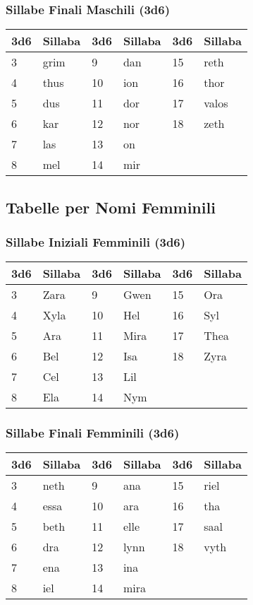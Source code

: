 \begin{multicols}{2}
{\subsubsection*{Sillabe Finali Maschili (3d6)}

\noindent\begin{tabularx}{\linewidth}{X|l|X|l|X|l}
	\toprule
\textbf{3d6} & \textbf{Sillaba} & \textbf{3d6} & \textbf{Sillaba} & \textbf{3d6} & \textbf{Sillaba} \\
\toprule
3 & grim & 9 & dan & 15 & reth \\
4 & thus & 10 & ion & 16 & thor \\
5 & dus & 11 & dor & 17 & valos \\
6 & kar & 12 & nor & 18 & zeth \\
7 & las & 13 & on & & \\
8 & mel & 14 & mir & & \\
\end{tabularx}


\subsection*{Tabelle per Nomi Femminili}

\subsubsection*{Sillabe Iniziali Femminili (3d6)}

\noindent\begin{tabularx}{\linewidth}{X|l|X|l|X|l}
	\toprule
\textbf{3d6} & \textbf{Sillaba} & \textbf{3d6} & \textbf{Sillaba} & \textbf{3d6} & \textbf{Sillaba} \\
\toprule
3 & Zara & 9 & Gwen & 15 & Ora \\
4 & Xyla & 10 & Hel & 16 & Syl \\
5 & Ara & 11 & Mira & 17 & Thea \\
6 & Bel & 12 & Isa & 18 & Zyra \\
7 & Cel & 13 & Lil & & \\
8 & Ela & 14 & Nym & & \\
\end{tabularx}

\subsubsection*{Sillabe Finali Femminili (3d6)}
\noindent\begin{tabularx}{\linewidth}{X|l|X|l|X|l}
	\toprule
\textbf{3d6} & \textbf{Sillaba} & \textbf{3d6} & \textbf{Sillaba} & \textbf{3d6} & \textbf{Sillaba} \\
\toprule
3 & neth & 9 & ana & 15 & riel \\
4 & essa & 10 & ara & 16 & tha \\
5 & beth & 11 & elle & 17 & saal \\
6 & dra & 12 & lynn & 18 & vyth \\
7 & ena & 13 & ina & & \\
8 & iel & 14 & mira & & \\
\end{tabularx}


}
\end{multicols}
